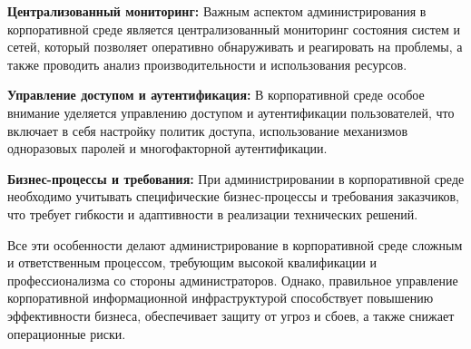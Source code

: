 \textbf{Централизованный мониторинг:} Важным аспектом администрирования в корпоративной среде является централизованный мониторинг состояния систем и сетей, который позволяет оперативно обнаруживать и реагировать на проблемы, а также проводить анализ производительности и использования ресурсов.

\textbf{Управление доступом и аутентификация:} В корпоративной среде особое внимание уделяется управлению доступом и аутентификации пользователей, что включает в себя настройку политик доступа, использование механизмов одноразовых паролей и многофакторной аутентификации.

\textbf{Бизнес-процессы и требования:} При администрировании в корпоративной среде необходимо учитывать специфические бизнес-процессы и требования заказчиков, что требует гибкости и адаптивности в реализации технических решений.

Все эти особенности делают администрирование в корпоративной среде сложным и ответственным процессом, требующим высокой квалификации и профессионализма со стороны администраторов. Однако, правильное управление корпоративной информационной инфраструктурой способствует повышению эффективности бизнеса, обеспечивает защиту от угроз и сбоев, а также снижает операционные риски.
